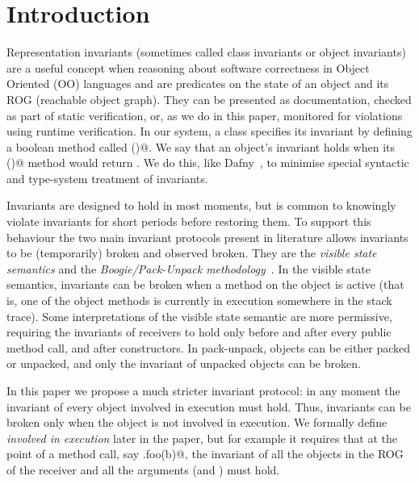 \section{Introduction}
\label{s:intro}
Representation invariants (sometimes called class invariants or object invariants) are
a useful concept when reasoning about software correctness in Object Oriented (OO) languages and are predicates on the state of an object and its ROG (reachable object graph).
They can be presented as documentation, checked as part of static verification, or, as we do in this paper, monitored for violations using runtime verification.
In our system, a class specifies its invariant by defining a boolean method called \Q@invariant()@.
We say that an object's invariant holds when its \Q@invariant()@ method would return \Q@true@. 
We do this, like Dafny~\cite{DBLP:conf/sigada/Leino12}, to minimise special syntactic and type-system treatment of invariants.%

Invariants are designed to hold in most moments, but 
is common to knowingly violate invariants for short periods before restoring them.
To support this behaviour the two main invariant protocols present in literature allows invariants to be (temporarily) broken and observed broken.
They are the \emph{visible state semantics} \cite{Meyer:1988:OSC:534929} and the \emph{Boogie/Pack-Unpack methodology}~\cite{DBLP:journals/jot/BarnettDFLS04}.
In the visible state semantics, invariants can be broken when a method on the object is active (that is, one of the object methods is currently in execution somewhere in the stack trace).
Some interpretations of the visible state semantic are more permissive, requiring the invariants of receivers to hold only before and after every public method call, and after constructors. 
In pack-unpack, objects can be either packed or unpacked, and only the invariant of unpacked objects can be broken.

In this paper we propose a much stricter invariant protocol: in any moment the invariant of every object involved in execution must hold.
Thus, invariants can be broken only when the object is not involved in execution. We formally define \emph{involved in execution} later in the paper, but for example it requires that at the point of a method call, say \Q@a.foo(b)@, the invariant of all the objects in the ROG of the receiver and all the arguments (\Q@a@ and \Q@b@) must hold.

